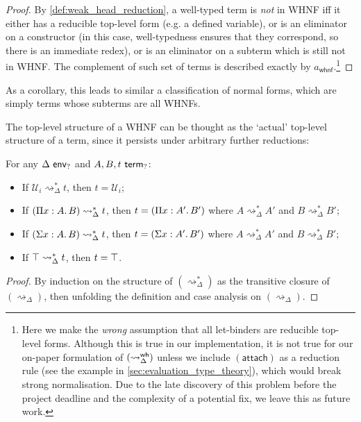 \documentclass[twoside]{report}
\begin{document}
\begin{proof}
By \cref{def:weak_head_reduction}, a well-typed term is \emph{not} in WHNF iff it either has a reducible top-level form (e.g. a defined variable), or is an eliminator on a constructor (in this case, well-typedness ensures that they correspond, so there is an immediate redex), or is an eliminator on a subterm which is still not in WHNF. The complement of such set of terms is described exactly by $a_\mathsf{whnf}$.\footnote{Here we make the \emph{wrong} assumption that all let-binders are reducible top-level forms. Although this is true in our implementation, it is not true for our on-paper formulation of $(\rightsquigarrow^{\mathsf{wh}}_\Delta)$ unless we include $(\mathsf{attach})$ as a reduction rule (see the example in \cref{sec:evaluation_type_theory}), which would break strong normalisation. Due to the late discovery of this problem before the project deadline and the complexity of a potential fix, we leave this as future work.}
\end{proof}

As a corollary, this leads to similar a classification of normal forms, which are simply terms whose subterms are all WHNFs.

The top-level structure of a WHNF can be thought as the `actual' top-level structure of a term, since it persists under arbitrary further reductions:

\begin{proposition}
\label{thm:persistence_of_type_formers}
For any $\Delta \ \mathsf{env}_{?}$ and $A, B, t \ \mathsf{term}_{?}$:
\begin{itemize}[noitemsep]
    \item If $\mathcal U_i \rightsquigarrow_\Delta^\ast t$, then $t = \mathcal U_i$;
    \item If $(\Pi{x} : {A}.\,{B}) \rightsquigarrow_\Delta^\ast t$, then $t = (\Pi{x} : {A'}.\,{B'})$ where $A \rightsquigarrow_\Delta^\ast {A'}$ and $B \rightsquigarrow_\Delta^\ast {B'}$;
    \item If $(\Sigma{x} : {A}.\,{B}) \rightsquigarrow_\Delta^\ast t$, then $t = (\Sigma{x} : {A'}.\,{B'})$ where $A \rightsquigarrow_\Delta^\ast {A'}$ and $B \rightsquigarrow_\Delta^\ast {B'}$;
    \item If $\top \rightsquigarrow_\Delta^\ast t$, then $t = \top$.
\end{itemize}
\end{proposition}

\begin{proof}
By induction on the structure of $(\rightsquigarrow_\Delta^\ast)$ as the transitive closure of $(\rightsquigarrow_\Delta)$, then unfolding the definition and case analysis on $(\rightsquigarrow_\Delta)$.
\end{proof}
\end{document}
